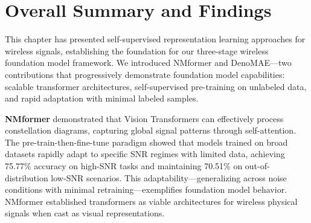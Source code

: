


\section{Overall Summary and Findings}

This chapter has presented self-supervised representation learning approaches for wireless signals, establishing the foundation for our three-stage wireless foundation model framework. We introduced NMformer and DenoMAE—two contributions that progressively demonstrate foundation model capabilities: scalable transformer architectures, self-supervised pre-training on unlabeled data, and rapid adaptation with minimal labeled samples.

\textbf{NMformer} demonstrated that Vision Transformers can effectively process constellation diagrams, capturing global signal patterns through self-attention. The pre-train-then-fine-tune paradigm showed that models trained on broad datasets rapidly adapt to specific SNR regimes with limited data, achieving 75.77\% accuracy on high-SNR tasks and maintaining 70.51\% on out-of-distribution low-SNR scenarios. This adaptability—generalizing across noise conditions with minimal retraining—exemplifies foundation model behavior. NMformer established transformers as viable architectures for wireless physical signals when cast as visual representations.

